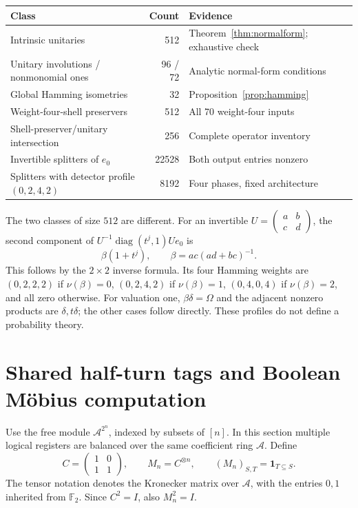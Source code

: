 \documentclass[11pt,a4paper]{article}
\theoremstyle{definition}\newtheorem{definition}[theorem]{Definition}
\theoremstyle{remark}\newtheorem{remark}[theorem]{Remark}
\newcommand{\F}{\mathbb F}
\newcommand{\A}{\mathcal A}
\newcommand{\diag}{\operatorname{diag}}
\numberwithin{equation}{section}
\begin{document}
\begin{center}\small
\begin{tabularx}{\linewidth}{@{}Y r L{.32\linewidth}@{}}\toprule
Class & Count & Evidence\\\midrule
Intrinsic unitaries & 512 & Theorem~\ref{thm:normalform}; exhaustive check\\
Unitary involutions / nonmonomial ones & 96 / 72 & Analytic normal-form conditions\\
Global Hamming isometries & 32 & Proposition~\ref{prop:hamming}\\
Weight-four-shell preservers & 512 & All 70 weight-four inputs\\
Shell-preserver/unitary intersection & 256 & Complete operator inventory\\
Invertible splitters of $e_0$ & 22528 & Both output entries nonzero\\
Splitters with detector profile $(0,2,4,2)$ & 8192 & Four phases, fixed architecture\\\bottomrule
\end{tabularx}
\end{center}
The two classes of size $512$ are different. For an invertible $U=\left(\begin{smallmatrix}a&b\\c&d\end{smallmatrix}\right)$, the second component of $U^{-1}\diag(t^j,1)Ue_0$ is
\[
 \beta(1+t^j),\qquad \beta=ac(ad+bc)^{-1}.
\]
This follows by the $2\times2$ inverse formula. Its four Hamming weights are $(0,2,2,2)$ if $\nu(\beta)=0$, $(0,2,4,2)$ if $\nu(\beta)=1$, $(0,4,0,4)$ if $\nu(\beta)=2$, and all zero otherwise. For valuation one, $\beta\delta=\Omega$ and the adjacent nonzero products are $\delta,t\delta$; the other cases follow directly. These profiles do not define a probability theory.

\section{Shared half-turn tags and Boolean M\"obius computation}\label{sec:anf}
Use the free module $\A^{2^n}$, indexed by subsets of $[n]$. In this section multiple logical registers are balanced over the same coefficient ring $\A$. Define
\[
 C=\begin{pmatrix}1&0\\1&1\end{pmatrix},\qquad M_n=C^{\otimes n},\qquad
 (M_n)_{S,T}=\mathbf1_{T\subseteq S}.
\]
The tensor notation denotes the Kronecker matrix over $\A$, with the entries $0,1$ inherited from $\F_2$. Since $C^2=I$, also $M_n^2=I$.
\end{document}
